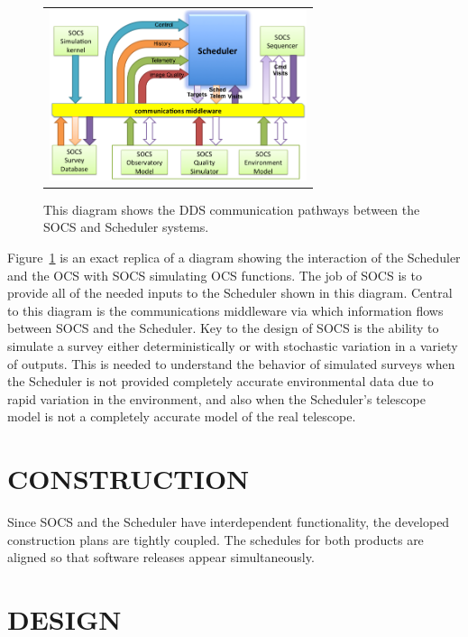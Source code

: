 \documentclass[]{spie}  %
\begin{document}
\begin{figure} [ht]
	\begin{center}
		\begin{tabular}{c}
			\includegraphics[height=5cm]{CommFlow.png}
		\end{tabular}
	\end{center}
	\caption[example]
	{ \label{fig:commflow} 
		This diagram shows the DDS communication pathways between the SOCS and Scheduler systems.}
\end{figure}

Figure~\ref*{fig:commflow} is an exact replica of a diagram showing the interaction of the Scheduler and the OCS with SOCS simulating OCS functions. The job of SOCS is to provide all of the needed inputs to the Scheduler shown in this diagram. Central to this diagram is the communications middleware via which information flows between SOCS and the Scheduler. Key to the design of SOCS is the ability to simulate a survey either deterministically or with stochastic variation in a variety of outputs. This is needed to understand the behavior of simulated surveys when the Scheduler is not provided completely accurate environmental data due to rapid variation in the environment, and also when the Scheduler’s telescope model is not a completely accurate model of the real telescope.

\section{CONSTRUCTION}
\label{sec:construction}

Since SOCS and the Scheduler have interdependent functionality, the developed construction plans are tightly coupled. The schedules for both products are aligned so that software releases appear simultaneously. 

\section{DESIGN}
\end{document}
